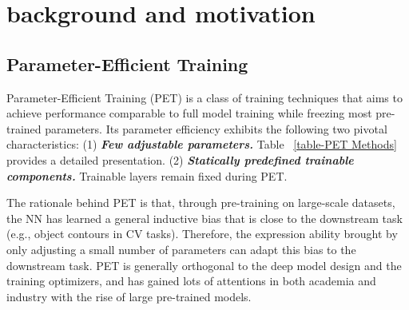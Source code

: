 \section{background and motivation}

\subsection{Parameter-Efficient Training}
\label{subsec:PET}



Parameter-Efficient Training (PET) is a class of training techniques that aims to achieve performance comparable to full model training while freezing most pre-trained parameters.
Its parameter efficiency exhibits the following two pivotal characteristics:
(1) \textit{\textbf{Few adjustable parameters.}} Table ~\ref{table-PET Methods} provides a detailed presentation. 
(2) \textbf{\textit{Statically predefined trainable components.}} Trainable layers remain fixed during PET.

The rationale behind PET is that, through pre-training on large-scale datasets, the NN has learned a general inductive bias that is close to the downstream task (e.g., object contours in CV tasks).
Therefore, the expression ability brought by only adjusting a small number of parameters can adapt this bias to the downstream task.
PET is generally orthogonal to the deep model design and the training optimizers, and has gained lots of attentions in both academia and industry with the rise of large pre-trained models.

